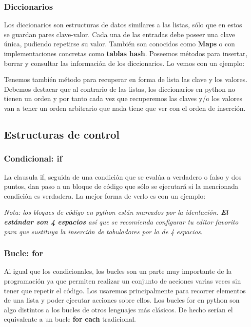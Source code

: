\documentclass{article}
\begin{document}
		\subsubsection{Diccionarios}
			\justify
			Los diccionarios son estructuras de datos similares a las listas, sólo que en estos se guardan pares clave-valor. 
			Cada una de las entradas debe poseer una clave única, pudiendo repetirse su valor. También son conocidos como 
			\textbf{Maps} o con implementaciones concretas como \textbf{tablas hash}. 
			Poseemos métodos para insertar, borrar y consultar las información de los diccionarios. Lo vemos con un ejemplo:
			
			\justify
			Tenemos también método para recuperar en forma de lista las clave y los valores. 
			Debemos destacar que al contrario de las listas, los diccionarios en python no tienen un orden y por tanto cada vez que
			recuperemos las claves y/o los valores van a tener un orden arbitrario que nada tiene que ver con el orden de inserción.
			
		
	\subsection{Estructuras de control}  
		\subsubsection{Condicional: if}
		\justify
		La clausula if, seguida de una condición que se evalúa a verdadero o falso y dos puntos, dan paso a un bloque de código
		que sólo se ejecutará si la mencionada condición es verdadera. La mejor forma de verlo es con un ejemplo:
		
		\justify
		\textit{Nota: los bloques de código en python están marcados por la identación. \textbf{El estándar son 4 espacios} así 
		que se recomienda configurar tu editor favorito para que sustituya la inserción de tabuladores por la de 4 espacios}.
		\subsubsection{Bucle: for}
		\justify
		Al igual que los condicionales, los bucles son un parte muy importante de la programación ya que permiten
		realizar un conjunto de acciones varias veces sin tener que repetir el código. Los usaremos principalmente para recorrer 
		elementos de una lista y poder ejecutar acciones sobre ellos. Los bucles for en python son algo distintos a los 
		bucles de otros lenguajes más clásicos. De hecho serían el equivalente a un bucle \textbf{for each} tradicional.
		
	 
\end{document}
